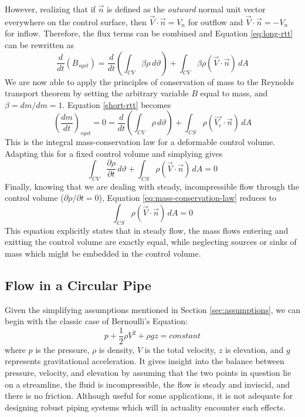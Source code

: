 \documentclass[11pt]{article} %
\numberwithin{equation}{section} %
\begin{document}
However, realizing that if $\vec{n}$ is defined as the \textit{outward} normal unit vector everywhere on the control surface, then $\vec{V} \cdot \vec{n} = V_{n}$ for outflow and $\vec{V} \cdot \vec{n} = -V_{n}$ for inflow. Therefore, the flux terms can be combined and Equation \ref{eq:long-rtt} can be rewritten as
\begin{equation} \label{eq:short-rtt}
\frac{d}{dt}(B_{syst}) = \frac{d}{dt} \left( \int_{CV} \beta \rho\, d\vartheta \right) + \int_{CV} \beta \rho(\vec{V} \cdot \vec{n})\, dA
\end{equation}
We are now able to apply the principles of conservation of mass to the Reynolds transport theorem by setting the arbitrary variable $B$ equal to mass, and $\beta = dm/dm =1$. Equation \ref{short-rtt} becomes
\begin{equation}
\left( \frac{dm}{dt} \right)_{syst} = 0 = \frac{d}{dt} \left( \int_{CV} \rho\, d\vartheta \right) + \int_{CS} \rho(\vec{V_{r}} \cdot \vec{n})\, dA
\end{equation}
This is the integral mass-conservation law for a deformable control volume. Adapting this for a fixed control volume and simplying gives
\begin{equation} \label{eq:mass-conservation-law}
\int_{CV} \frac{\partial \rho}{\partial t}\, d\vartheta + \int_{CS} \rho(\vec{V} \cdot \vec{n})\, dA = 0
\end{equation}
Finally, knowing that we are dealing with steady, incompressible flow through the control volume ($\partial \rho/ \partial t = 0$), Equation \ref{eq:mass-conservation-law} reduces to
\begin{equation}
\int_{CS} \rho(\vec{V} \cdot \vec{n})\, dA = 0
\end{equation}
This equation explicitly states that in steady flow, the mass flows entering and exitting the control volume are exactly equal, while neglecting sources or sinks of mass which might be embedded in the control volume.

\subsection{Flow in a Circular Pipe}

Given the simplifying assumptions mentioned in Section \ref{sec:assumptions}, we can begin with the classic case of Bernoulli's Equation:
\begin{equation} \label{eq:bernoulli}
p + \frac{1}{2} \rho V^{2} + \rho g z = constant
\end{equation}
where $p$ is the pressure, $\rho$ is density, $V$ is the total velocity, $z$ is elevation, and $g$ represents gravitational acceleration. It gives insight into the balance between pressure, velocity, and elevation by assuming that the two points in question lie on a streamline, the fluid is incompressible, the flow is steady and inviscid, and there is no friction. Although useful for some applications, it is not adequate for designing robust piping systems which will in actuality encounter such effects.
\end{document}
